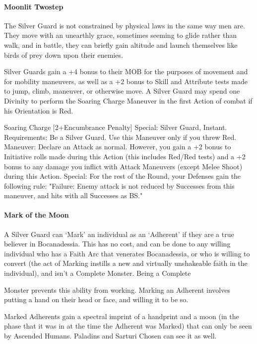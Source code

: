 \documentclass[oneside,11pt,english]{book}
\begin{document}
\paragraph{Moonlit Twostep}
The Silver Guard is not constrained by physical laws in the same way men are. They move with 
an unearthly grace, sometimes seeming to glide rather than walk, and in battle, they can briefly 
gain altitude and launch themselves like birds of prey down upon their enemies. 


Silver Guards gain a +4 bonus to their MOB for the purposes of movement and for mobility 
maneuvers, as well as a +2 bonus to Skill and Attribute tests made to jump, climb, maneuver, or 
otherwise move. A Silver Guard may spend one Divinity to perform the Soaring Charge 
Maneuver in the first Action of combat if his Orientation is Red. 


Soaring Charge  %
[2+Encumbrance Penalty] 
Special: Silver Guard, Instant. 
Requirements: Be a Silver Guard. Use this Maneuver only if you threw Red. 
Maneuver: Declare an Attack as normal. However, you gain a +2 bonus to Initiative rolls made 
during this Action (this includes Red/Red tests) and a +2 bonus to any damage you inflict with 
Attack Maneuvers (except Melee Shoot) during this Action. 
Special: For the rest of the Round, your Defenses gain the following rule: "Failure: Enemy 
attack is not reduced by Successes from this maneuver, and hits with all Successes as BS." 


\paragraph{Mark of the Moon}
A Silver Guard can ‘Mark’ an individual as an ‘Adherent’ if they are a true believer in 
Bocanadessia. This has no cost, and can be done to any willing individual who has a Faith Arc 
that venerates Bocanadessia, or who is willing to convert (the act of Marking instills a new and 
virtually unshakeable faith in the individual), and isn't a Complete Monster. Being a Complete 


Monster prevents this ability from working. Marking an Adherent involves putting a hand on 
their head or face, and willing it to be so. 


Marked Adherents gain a spectral imprint of a handprint and a moon (in the phase that it was in at 
the time the Adherent was Marked) that can only be seen by Ascended Humans. Paladins and 
Sarturi Chosen can see it as well. 
\end{document}
